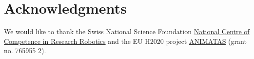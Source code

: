 \documentclass{sig-alternate-05-2015}
\begin{document}
\section{Acknowledgments}
We would like to thank the Swiss National Science Foundation 
\href{http://www.nccr-robotics.ch/}{National Centre of Competence in Research 
Robotics} and the EU H2020 project \href{http://animatas.eu}{ANIMATAS} (grant no. 765955 2).


  
\end{document}
